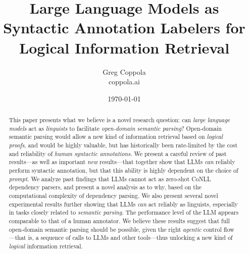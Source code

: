 \documentclass[11pt]{article}
\title{Large Language Models as Syntactic Annotation Labelers for Logical Information Retrieval}
\author{Greg Coppola\\coppola.ai}
\date{\today}
\begin{document}
\maketitle

\begin{abstract}
    This paper presents what we believe is a novel research question: can \emph{large language models} act as \emph{linguists} to facilitate \emph{open-domain semantic parsing}?
    Open-domain semantic parsing would allow a new kind of information retrieval based on \emph{logical proofs}, and would be highly valuable, but has historically been rate-limited by the cost and reliability of \emph{human syntactic annotations}.
    We present a careful review of past results---as well as important \emph{new} results---that together show that LLMs \emph{can} reliably perform syntactic annotation, but that this ability is highly dependent on the choice of \emph{prompt}.
    We analyze past findings that LLMs cannot act as zero-shot CoNLL dependency parsers, and present a novel analysis as to why, based on the computational complexity of dependency parsing.
    We also present several novel experimental results further showing that LLMs \emph{can} act reliably as linguists, especially in tasks closely related to \emph{semantic parsing}.
    The performance level of the LLM appears comparable to that of a human annotator.
    We believe these results suggest that full open-domain semantic parsing should be possible, given the right \emph{agentic} control flow---that is, a sequence of calls to LLMs and other tools---thus unlocking a new kind of \emph{logical} information retrieval.
\end{abstract}
\end{document}
